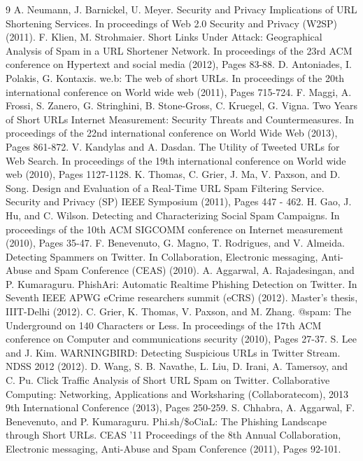 \documentclass[conference]{IEEEtran}
\begin{document}
\begin{thebibliography} {9}
 A. Neumann, J. Barnickel, U. Meyer. Security and Privacy Implications of URL Shortening Services. In proceedings of Web 2.0 Security and Privacy (W2SP) (2011).
 F. Klien, M. Strohmaier. Short Links Under Attack: Geographical Analysis of Spam in a URL Shortener Network. In proceedings of the 23rd ACM conference on Hypertext and social media (2012), Pages 83-88. 
 D. Antoniades, I. Polakis, G. Kontaxis. we.b: The web of short URLs. In proceedings of the 20th international conference on World wide web (2011), Pages 715-724. 
 F. Maggi, A. Frossi, S. Zanero, G. Stringhini, B. Stone-Gross, C. Kruegel, G. Vigna. Two Years of Short URLs Internet Measurement: Security Threats and Countermeasures. In proceedings of the 22nd international conference on World Wide Web (2013), Pages 861-872. 
 V. Kandylas and A. Dasdan. The Utility of Tweeted URLs for Web Search. In proceedings of the 19th international conference on World wide web (2010), Pages 1127-1128.  
 K. Thomas, C. Grier, J. Ma, V. Paxson, and D. Song. Design and Evaluation of a Real-Time URL Spam Filtering Service. Security and Privacy (SP) IEEE Symposium (2011), Pages 447 - 462.
 H. Gao, J. Hu, and C. Wilson. Detecting and Characterizing Social Spam Campaigns. In proceedings of the 10th ACM SIGCOMM conference on Internet measurement (2010), Pages 35-47.
 F. Benevenuto, G. Magno, T. Rodrigues, and V. Almeida. Detecting Spammers on Twitter. In Collaboration, Electronic messaging, Anti-Abuse and Spam Conference (CEAS) (2010).
 A. Aggarwal, A. Rajadesingan, and P. Kumaraguru. PhishAri: Automatic Realtime Phishing Detection on Twitter.  In Seventh IEEE APWG eCrime researchers summit (eCRS) (2012). Master's thesis, IIIT-Delhi (2012).
 C. Grier, K. Thomas, V. Paxson, and M. Zhang. @spam: The Underground on 140 Characters or Less. In proceedings of the 17th ACM conference on Computer and communications security (2010), Pages 27-37.
 S. Lee and J. Kim. WARNINGBIRD: Detecting Suspicious URLs in Twitter Stream. NDSS 2012 (2012).
 D. Wang, S. B. Navathe, L. Liu, D. Irani, A. Tamersoy, and C. Pu. Click Traffic Analysis of Short URL Spam on Twitter. Collaborative Computing: Networking, Applications and Worksharing (Collaboratecom), 2013 9th International Conference (2013), Pages 250-259.
 S. Chhabra, A. Aggarwal, F. Benevenuto, and P. Kumaraguru. Phi.sh/\$oCiaL: The Phishing Landscape through Short URLs. CEAS '11 Proceedings of the 8th Annual Collaboration, Electronic messaging, Anti-Abuse and Spam Conference (2011), Pages 92-101.

\end{thebibliography}
\end{document}
